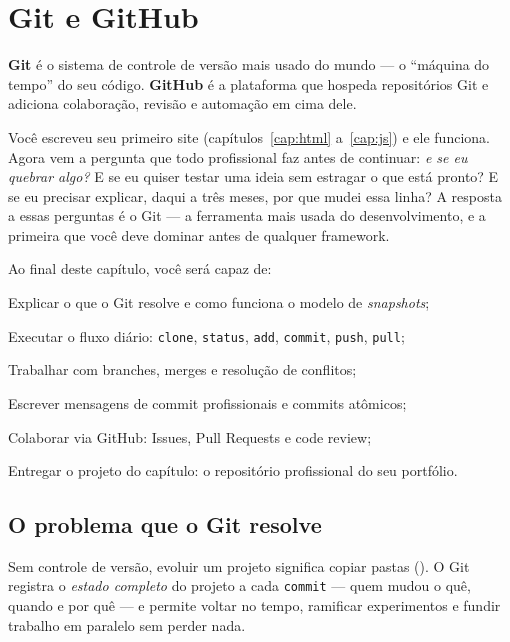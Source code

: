 \chapter{Git e GitHub}
\label{cap:git}

\begin{caixaconceito}
\textbf{Git} é o sistema de controle de versão mais usado do mundo — o
``máquina do tempo'' do seu código. \textbf{GitHub} é a plataforma que hospeda
repositórios Git e adiciona colaboração, revisão e automação em cima dele.
\end{caixaconceito}

Você escreveu seu primeiro site (capítulos~\ref{cap:html} a~\ref{cap:js}) e ele
funciona. Agora vem a pergunta que todo profissional faz antes de continuar:
\emph{e se eu quebrar algo?} E se eu quiser testar uma ideia sem estragar o
que está pronto? E se eu precisar explicar, daqui a três meses, por que
mudei essa linha? A resposta a essas perguntas é o Git — a ferramenta mais
usada do desenvolvimento, e a primeira que você deve dominar antes de
qualquer framework.

Ao final deste capítulo, você será capaz de:
\begin{objetivos}
  \item Explicar o que o Git resolve e como funciona o modelo de \emph{snapshots};
  \item Executar o fluxo diário: \texttt{clone}, \texttt{status}, \texttt{add}, \texttt{commit}, \texttt{push}, \texttt{pull};
  \item Trabalhar com branches, merges e resolução de conflitos;
  \item Escrever mensagens de commit profissionais e commits atômicos;
  \item Colaborar via GitHub: Issues, Pull Requests e code review;
  \item Entregar o projeto do capítulo: o repositório profissional do seu portfólio.
\end{objetivos}

\section{O problema que o Git resolve}

Sem controle de versão, evoluir um projeto significa copiar pastas
(). O Git registra o \emph{estado
completo} do projeto a cada \texttt{commit} — quem mudou o quê, quando e por
quê — e permite voltar no tempo, ramificar experimentos e fundir trabalho em
paralelo sem perder nada.

